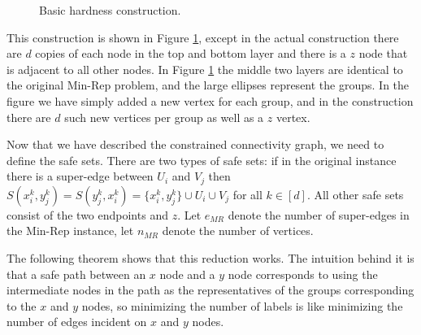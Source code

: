 \documentclass[11pt,letterpaper]{article}
\theoremstyle{definition}
\newcounter{note}[section]
\begin{document}
\begin{figure}
\centerline{}
\caption{Basic hardness construction.}
\label{fig:CC_hard}
\end{figure}

This construction is shown in Figure \ref{fig:CC_hard}, except in the actual construction there are $d$ copies of each node in the top and bottom layer and there is a $z$ node that is adjacent to all other nodes.  In Figure \ref{fig:CC_hard} the middle two layers are identical to the original {\sc Min-Rep} problem, and the large ellipses represent the groups.  In the figure we have simply added a new vertex for each group, and in the construction there are $d$ such new vertices per group as well as a $z$ vertex.

Now that we have described the constrained connectivity graph, we need
to define the safe sets.  There are two types of safe sets: if in the
original instance there is a super-edge between $U_i$ and $V_j$ then
$S(x_i^k, y_j^k) = S(y_j^k, x_i^k) = \{x_i^k, y_j^k\} \cup U_i \cup
V_j$ for all $k \in [d]$.  All other safe sets consist of the two
endpoints and $z$.  Let $e_{MR}$ denote the number of super-edges in
the {\sc Min-Rep} instance, let $n_{MR}$ denote the number of
vertices.

The following theorem shows that this reduction works.  The intuition behind it is that a safe path between an $x$ node and a $y$ node corresponds to using the intermediate nodes in the path as the representatives of the groups corresponding to the $x$ and $y$ nodes, so minimizing the number of labels is like minimizing the number of edges incident on $x$ and $y$ nodes.
\end{document}
